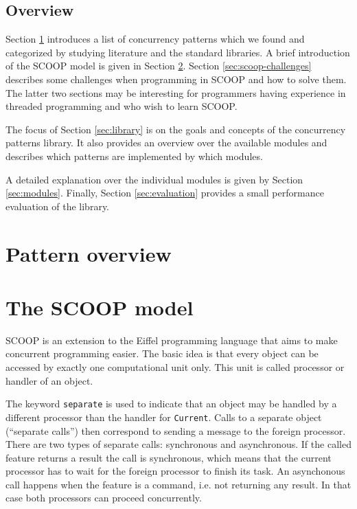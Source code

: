 \documentclass[a4paper,10pt]{article}
\begin{document}
\subsection{Overview}

Section \ref{sec:pattern_overview} introduces a list of concurrency patterns which we found and categorized by studying literature and the standard libraries.
A brief introduction of the SCOOP model is given in Section \ref{sec:scoop-model}.
Section \ref{sec:scoop-challenges} describes some challenges when programming in SCOOP and how to solve them.
The latter two sections may be interesting for programmers having experience in threaded programming and who wish to learn SCOOP.

The focus of Section \ref{sec:library} is on the goals and concepts of the concurrency patterns library.
It also provides an overview over the available modules and describes which patterns are implemented by which modules.

A detailed explanation over the individual modules is given by Section \ref{sec:modules}.
Finally, Section \ref{sec:evaluation} provides a small performance evaluation of the library.

\section {Pattern overview}
\label{sec:pattern_overview}



\section {The SCOOP model}
\label {sec:scoop-model}

SCOOP is an extension to the Eiffel programming language that aims to make concurrent programming easier.
The basic idea is that every object can be accessed by exactly one computational unit only.
This unit is called processor or handler of an object.

The keyword \lstinline!separate! is used to indicate that an object may be handled by a different processor than the handler for \lstinline!Current!.
Calls to a separate object (``separate calls'') then correspond to sending a message to the foreign processor.
There are two types of separate calls: synchronous and asynchronous.
If the called feature returns a result the call is synchronous, which means that the current processor has to wait for the foreign processor to finish its task.
An asynchonous call happens when the feature is a command, i.e. not returning any result.
In that case both processors can proceed concurrently.
\end{document}

